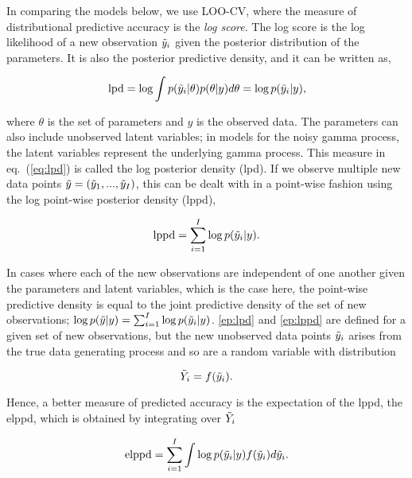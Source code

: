 In comparing the models below, we use LOO-CV, where the measure of distributional predictive accuracy is the \emph{log score}. The log score is the log likelihood of a new observation $\Tilde{y}_i$ given the posterior distribution of the parameters. It is also the posterior predictive density, and it can be written as,

\begin{equation} \label{eq:lpd}
    \hbox{lpd} = \log \int p(\Tilde{y}_i|\theta)p(\theta|y)d\theta = \log p(\Tilde{y}_i | y),
\end{equation}

where $\theta$ is the set of parameters and $y$ is the observed data. The parameters can also include unobserved latent variables; in models for the noisy gamma process, the latent variables represent the underlying gamma process.   This measure in eq.~(\ref{eq:lpd}) is called the log posterior density (lpd). If we observe multiple new data points $\Tilde{y} = (\Tilde{y}_1, ..., \Tilde{y}_I)$, this can be dealt with in a point-wise fashion using the log point-wise posterior density (lppd),

\begin{equation} \label{eq:lppd}
    \hbox{lppd} = \sum^I_{i = 1} \log p(\Tilde{y}_i|y).
\end{equation}

In cases where each of the new observations are independent of one another given the parameters and latent variables, which is the case here, the point-wise predictive density is equal to the joint predictive density of the set of new observations; $\log p(\Tilde{y}|y) = {\sum}^I_{i = 1} \log p(\Tilde{y}_i|y)$. \eqref{ep:lpd} and \eqref{ep:lppd} are defined for a given set of new observations, but the new unobserved data points $\Tilde{y}_i$ arises from the true data generating process and so are a random variable with distribution

\begin{equation} \label{ep:y_tild_dist}
    \Tilde{Y}_i = f(\Tilde{y}_i).
\end{equation}

Hence, a better measure of predicted accuracy is the expectation of the lppd, the elppd, which is obtained by integrating over $\Tilde{Y}_i$

\begin{equation} \label{ep:elppd}
    \hbox{elppd} = \sum^I_{i = 1} \int \log p(\Tilde{y}_i|y)f(\Tilde{y}_i) d\Tilde{y}_i.
\end{equation}

